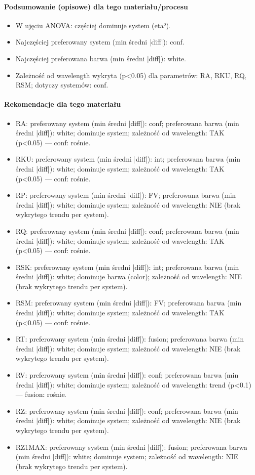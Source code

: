 \documentclass[
  10pt,
]{article}
\begin{document}
\paragraph{Podsumowanie (opisowe) dla tego materiału/procesu}
\begin{itemize}
\item W ujęciu ANOVA: częściej dominuje system (eta²).
\item Najczęściej preferowany system (min średni |diff|): conf.
\item Najczęściej preferowana barwa (min średni |diff|): white.
\item Zależność od wavelength wykryta (p<0.05) dla parametrów: RA, RKU, RQ, RSM; dotyczy systemów: conf.
\end{itemize}
\paragraph{Rekomendacje dla tego materiału}
\begin{itemize}
\item RA: preferowany system (min średni |diff|): conf; preferowana barwa (min średni |diff|): white; dominuje system; zależność od wavelength: TAK (p<0.05) — conf: rośnie.
\item RKU: preferowany system (min średni |diff|): int; preferowana barwa (min średni |diff|): white; dominuje system; zależność od wavelength: TAK (p<0.05) — conf: rośnie.
\item RP: preferowany system (min średni |diff|): FV; preferowana barwa (min średni |diff|): white; dominuje system; zależność od wavelength: NIE (brak wykrytego trendu per system).
\item RQ: preferowany system (min średni |diff|): conf; preferowana barwa (min średni |diff|): white; dominuje system; zależność od wavelength: TAK (p<0.05) — conf: rośnie.
\item RSK: preferowany system (min średni |diff|): int; preferowana barwa (min średni |diff|): white; dominuje barwa (color); zależność od wavelength: NIE (brak wykrytego trendu per system).
\item RSM: preferowany system (min średni |diff|): FV; preferowana barwa (min średni |diff|): white; dominuje system; zależność od wavelength: TAK (p<0.05) — conf: rośnie.
\item RT: preferowany system (min średni |diff|): fusion; preferowana barwa (min średni |diff|): white; dominuje system; zależność od wavelength: NIE (brak wykrytego trendu per system).
\item RV: preferowany system (min średni |diff|): conf; preferowana barwa (min średni |diff|): white; dominuje system; zależność od wavelength: trend (p<0.1) — fusion: rośnie.
\item RZ: preferowany system (min średni |diff|): conf; preferowana barwa (min średni |diff|): white; dominuje system; zależność od wavelength: NIE (brak wykrytego trendu per system).
\item RZ1MAX: preferowany system (min średni |diff|): fusion; preferowana barwa (min średni |diff|): white; dominuje system; zależność od wavelength: NIE (brak wykrytego trendu per system).
\end{itemize}
\end{document}
